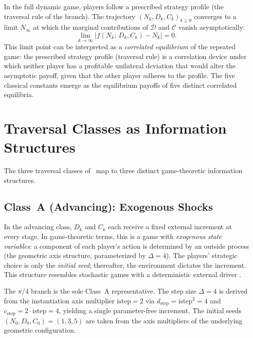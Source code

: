 \documentclass[12pt]{article}
\theoremstyle{definition}
\theoremstyle{remark}
\begin{document}
In the full dynamic game, players follow a prescribed strategy profile (the traversal
rule of the branch).  The trajectory $(N_k, D_k, C_k)_{k \geq 0}$ converges to a limit
$N_\infty$ at which the marginal contributions of $\mathcal{D}$ and $\mathcal{C}$
vanish asymptotically:
\[
  \lim_{k \to \infty} \bigl\lvert f(N_k;\, D_k, C_k) - N_k \bigr\rvert = 0.
\]
This limit point can be interpreted as a \emph{correlated equilibrium} of the repeated
game: the prescribed strategy profile (traversal rule) is a correlation device under
which neither player has a profitable unilateral deviation that would alter the
asymptotic payoff, given that the other player adheres to the profile.  The five
classical constants emerge as the equilibrium payoffs of five distinct correlated
equilibria.

\section{Traversal Classes as Information Structures}
\label{sec:traversal}

The three traversal classes of~\cite{Mil26a} map to three distinct game-theoretic
information structures.

\subsection{Class~A (Advancing): Exogenous Shocks}

In the advancing class, $D_k$ and $C_k$ each receive a fixed external increment at
every stage.  In game-theoretic terms, this is a game with \emph{exogenous state
variables}: a component of each player's action is determined by an outside process (the
geometric axis structure, parameterized by $\Delta = 4$).  The players' strategic choice
is only the \emph{initial seed}; thereafter, the environment dictates the increment.
This structure resembles stochastic games with a deterministic external driver
\cite{Sha53}.

The $\pi/4$ branch is the sole Class~A representative.  The step size $\Delta = 4$ is
derived from the instantiation axis multiplier $\mathrm{istep} = 2$ via
$d_{\mathrm{step}} = \mathrm{istep}^2 = 4$ and $c_{\mathrm{step}} = 2 \cdot
\mathrm{istep} = 4$, yielding a single parameter-free increment.  The initial seeds
$(N_0, D_0, C_0) = (1, 3, 5)$ are taken from the axis multipliers of the underlying
geometric configuration.
\end{document}
